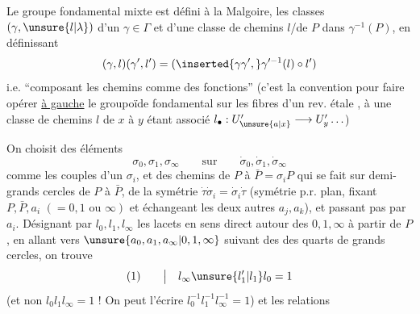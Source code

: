 Le groupe fondamental mixte est défini à la Malgoire,  les classes $(\gamma,\unsure{l|\lambda})$ d'un $\gamma\in\Gamma$ et d'une classe de chemins $l$/de $P$ dans $\gamma^{-1}(P)$, en définissant
\[
(\gamma,l)(\gamma',l')=(\inserted{\gamma\gamma',}\gamma'^{-1}(l)\circ l')
\]
i.e. ``composant les chemins comme des fonctions'' (c'est la convention pour faire opérer \uline{à gauche} le groupoïde fondamental sur les fibres d'un rev. étale , à une classe de chemins $l$ de $x$ à $y$ étant associé $l_\bullet:U'_{\unsure{a|x}}\longrightarrow U'_y\ldots$)

On choisit des éléments
\[
\sigma_0,\sigma_1,\sigma_\infty\qquad\text{sur}\qquad\dot\sigma_0,\dot\sigma_1,\dot\sigma_\infty
\]
comme les couples d'un $\sigma_i$, et des chemins  de $P$ à $\bar P=\sigma_iP$ qui se fait sur   demi-grands cercles de $P$ à $\bar P$,    de la symétrie $\dot\tau\dot\sigma_i=\dot\sigma_i\dot\tau$ (symétrie p.r.  plan, fixant $P,\bar P,a_i$ $(=0,1\text{ ou }\infty)$ et échangeant les deux autres $a_j,a_k$), et  passant pas par $a_i$.  Désignant par $l_0,l_1,l_\infty$  les lacets en sens direct autour des $0,1,\infty$ à partir de $P$, en allant vers $\unsure{a_0,a_1,a_\infty|0,1,\infty}$ suivant des des quarts de grands cercles, on trouve
\[
(1)\qquad\big|\quad l_\infty\unsure{l'_1|l_1}l_0=1
\]
(et non $l_0l_1l_\infty=1$ !  On peut l'écrire $l_0^{-1}l_1^{-1}l_\infty^{-1}=1$)
et les relations
